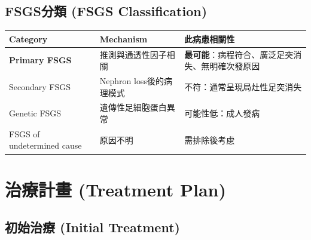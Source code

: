 \documentclass[12pt,a4paper]{article}
\begin{document}
\subsection{FSGS分類 (FSGS Classification)}

\begin{longtable}{>{\raggedright\arraybackslash}p{4cm} >{\raggedright\arraybackslash}p{5cm} >{\raggedright\arraybackslash}p{6cm}}
\toprule
\textbf{Category} & \textbf{Mechanism} & \textbf{此病患相關性} \\
\midrule
\endfirsthead
\bottomrule
\endlastfoot

\textbf{Primary FSGS} & 推測與通透性因子相關 & \textbf{最可能}：病程符合、廣泛足突消失、無明確次發原因 \\
\midrule
Secondary FSGS & Nephron loss後的病理模式 & 不符：通常呈現局灶性足突消失 \\
\midrule
Genetic FSGS & 遺傳性足細胞蛋白異常 & 可能性低：成人發病 \\
\midrule
FSGS of undetermined cause & 原因不明 & 需排除後考慮 \\

\end{longtable}

\section{治療計畫 (Treatment Plan)}

\subsection{初始治療 (Initial Treatment)}
\end{document}
